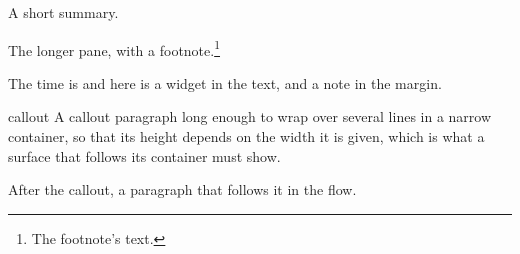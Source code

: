 \begin{webaccordion}[initial=collapsed]
\begin{webpane}[collapsed] A short summary. \webnextpane \end{webpane}
\begin{webpane}[expanded] The longer pane, with a footnote.\footnote{The footnote's text.} \webprevpane \end{webpane}
\end{webaccordion}
The time is  and here is a
widget in the text, and a
note in the margin.
\begin{webstream}[class=fancy big, --x-accent=red, tone=warm]{callout}
A callout paragraph long enough to wrap over several lines in a narrow
container, so that its height depends on the width it is given, which is what
a surface that follows its container must show.
\end{webstream}
After the callout, a paragraph that follows it in the flow.
